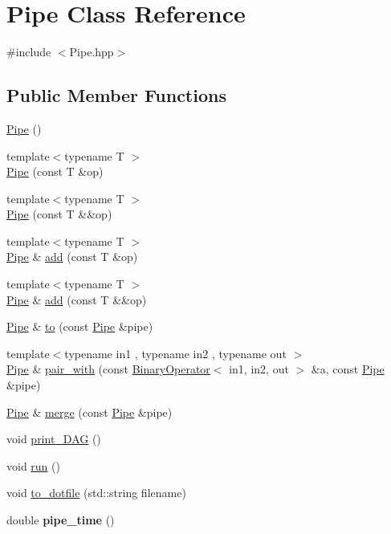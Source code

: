 \hypertarget{class_pipe}{\section{\-Pipe \-Class \-Reference}
\label{class_pipe}
}


{\ttfamily \#include $<$\-Pipe.\-hpp$>$}

\subsection*{\-Public \-Member \-Functions}
\begin{DoxyCompactItemize}
\item 
\hyperlink{class_pipe_a91ddad07e89d5585b1cf27fa7860e201}{\-Pipe} ()
\item 
{\footnotesize template$<$typename T $>$ }\\\hyperlink{class_pipe_a2112ea3ec975e32d471195d7d37dced9}{\-Pipe} (const \-T \&op)
\item 
{\footnotesize template$<$typename T $>$ }\\\hyperlink{class_pipe_ad634a48b656601f80db6fa413c47b035}{\-Pipe} (const \-T \&\&op)
\item 
{\footnotesize template$<$typename T $>$ }\\\hyperlink{class_pipe}{\-Pipe} \& \hyperlink{class_pipe_aa0577b9eaa033a89b6a76353764eed39}{add} (const \-T \&op)
\item 
{\footnotesize template$<$typename T $>$ }\\\hyperlink{class_pipe}{\-Pipe} \& \hyperlink{class_pipe_af0843b7b6b6c33606fce7a995450678a}{add} (const \-T \&\&op)
\item 
\hyperlink{class_pipe}{\-Pipe} \& \hyperlink{class_pipe_a1772082ed12c8b1df452a40439738138}{to} (const \hyperlink{class_pipe}{\-Pipe} \&pipe)
\item 
{\footnotesize template$<$typename in1 , typename in2 , typename out $>$ }\\\hyperlink{class_pipe}{\-Pipe} \& \hyperlink{class_pipe_a5ddf06055414d4ad0b511596dbf3a390}{pair\-\_\-with} (const \hyperlink{class_binary_operator}{\-Binary\-Operator}$<$ in1, in2, out $>$ \&a, const \hyperlink{class_pipe}{\-Pipe} \&pipe)
\item 
\hyperlink{class_pipe}{\-Pipe} \& \hyperlink{class_pipe_ac07aed5f6efda8248a8d3fe7410df6f2}{merge} (const \hyperlink{class_pipe}{\-Pipe} \&pipe)
\item 
void \hyperlink{class_pipe_a288d5b72778f836c7fbca280bf858976}{print\-\_\-\-D\-A\-G} ()
\item 
void \hyperlink{class_pipe_a6ecb3df1580730102c3e925875962bfd}{run} ()
\item 
void \hyperlink{class_pipe_a305c4d6db780c5e2d46a89f756d9aadf}{to\-\_\-dotfile} (std\-::string filename)
\item 
\hypertarget{class_pipe_a215364dec5b8e269a8364583d359d301}{double {\bfseries pipe\-\_\-time} ()}\label{class_pipe_a215364dec5b8e269a8364583d359d301}

\end{DoxyCompactItemize}


